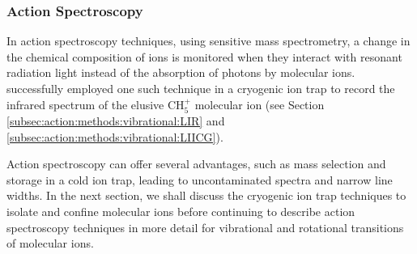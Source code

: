 \subsubsection*{Action Spectroscopy}

In action spectroscopy techniques, using sensitive mass spectrometry, a change in the chemical composition of ions is monitored when they interact with resonant radiation light instead of the absorption of photons by molecular ions.
\citet{asvany_understanding_2005} successfully employed one such technique in a
cryogenic ion trap to record the infrared spectrum of the elusive CH$_5^+$
molecular ion (see Section \ref{subsec:action:methods:vibrational:LIR} and
\ref{subsec:action:methods:vibrational:LIICG}).

Action spectroscopy can offer several advantages, such as mass selection and
storage in a cold ion trap, leading to uncontaminated spectra and narrow line
widths. In the next section, we shall discuss the cryogenic ion trap techniques
to isolate and confine molecular ions before continuing to describe action spectroscopy
techniques in more detail for vibrational and rotational transitions of molecular ions.
